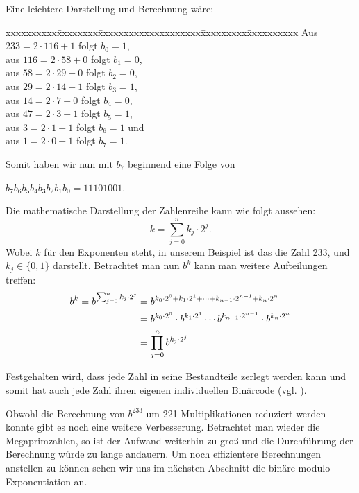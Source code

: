 \documentclass[12pt,a4paper]{article}
\theoremstyle{definition}
\begin{document}
Eine leichtere Darstellung und Berechnung wäre:
\begin{tabbing}
xxxxxxxxxx\=xxxxxxxx\=xxxxxxxxxxxxxxxxxxxx\=xxxxxxxxx\=xxxxxxxxxx\kill
\> Aus \> $233 = 2 \cdot 116 + 1$ \> folgt \> $b_0 = 1$, \\
\> aus \> $116 = 2 \cdot 58 + 0$  \> folgt \> $b_1 = 0$, \\
\> aus \> $58  = 2 \cdot 29 + 0$  \> folgt \> $b_2 = 0$, \\
\> aus \> $29  = 2 \cdot 14 + 1$  \> folgt \> $b_3 = 1$, \\
\> aus \> $14  = 2 \cdot 7 + 0$   \> folgt \> $b_4 = 0$, \\
\> aus \> $47  = 2 \cdot 3 + 1$   \> folgt \> $b_5 = 1$, \\
\> aus \> $3   = 2 \cdot 1 + 1$   \> folgt \> $b_6 = 1$  und \\
\> aus \> $1   = 2 \cdot 0 + 1$   \> folgt \> $b_7 = 1$.
\end{tabbing}
Somit haben wir nun mit $b_7$ beginnend eine Folge von
\begin{center}
$b_7b_6b_5b_4b_3b_2b_1b_0 = 11101001$.
\end{center}
Die mathematische Darstellung der Zahlenreihe kann wie folgt aussehen:
\[k = \sum_{j=0}^n k_j \cdot 2^j.\]
Wobei $k$ für den Exponenten steht, in unserem Beispiel ist das die Zahl 233, und $k_j \in \{0, 1\}$ darstellt.
Betrachtet man nun $b^k$ kann man weitere Aufteilungen treffen:
\begin{align}\setcounter{equation}{0}
b^k = b^{\sum_{j=0}^n k_j \cdot 2^j} &= b^{k_0 \cdot 2^0 + k_1 \cdot 2^1 + \cdots + k_{n-1} \cdot 2^{n-1} + k_n \cdot 2^n} \\
                                    &= b^{k_0 \cdot 2^0} \cdot b^{k_1 \cdot 2^1} \cdots b^{k_{n-1} \cdot 2^{n-1}} \cdot b^{{k_n} \cdot 2^n} \\
                                    &= \prod_{j=0}^n b^{k_j \cdot 2^j}
\end{align}

Festgehalten wird, dass jede Zahl in seine Bestandteile zerlegt werden kann und somit hat auch jede Zahl ihren eigenen individuellen Binärcode (vgl. \cite[130-132]{Meinel2015}).

Obwohl die Berechnung von $b^{233}$ um 221 Multiplikationen reduziert werden konnte gibt es noch eine weitere Verbesserung.
Betrachtet man wieder die Megaprimzahlen, so ist der Aufwand weiterhin zu groß und die Durchführung der Berechnung würde zu lange andauern.
Um noch effizientere Berechnungen anstellen zu können sehen wir uns im nächsten Abschnitt die binäre modulo-Exponentiation an.
\end{document}
